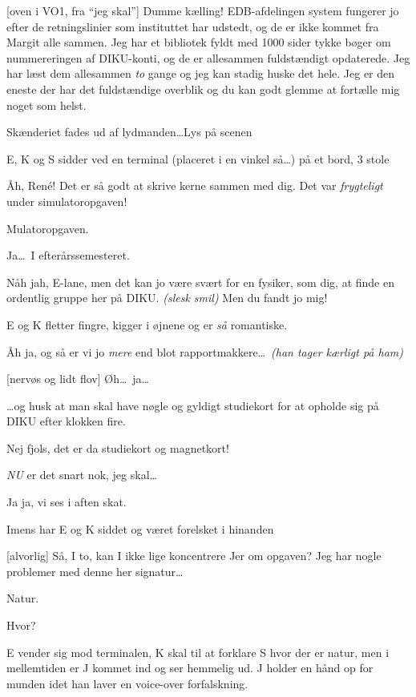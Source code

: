 \documentclass[danish]{article}
\begin{document}
\begin{sketch}
[oven i VO1, fra ``jeg skal''] Dumme kælling! EDB-afdelingen system
fungerer jo efter de retningslinier som instituttet har udstedt, og de er ikke
kommet fra Margit alle sammen. Jeg har et bibliotek fyldt med 1000 sider tykke
bøger om nummereringen af DIKU-konti, og de er allesammen fuldstændigt
opdaterede. Jeg har læst dem allesammen \emph{to} gange og jeg kan stadig huske
det hele. Jeg er den eneste der har det fuldstændige overblik og du kan godt
glemme at fortælle mig noget som helst.

\scene Skænderiet fades ud af lydmanden\ldots Lys på scenen

\scene E, K og S sidder ved en terminal (placeret i en vinkel så\ldots) på et
bord, 3 stole

 Åh, Ren\'e! Det er så godt at skrive kerne sammen med dig. Det var
\emph{frygteligt} under simulatoropgaven!

 Mulatoropgaven.

 Ja\ldots\ I efterårssemesteret.

 Nåh jah, E-lane, men det kan jo være svært for en fysiker, som dig, at
finde en ordentlig gruppe her på DIKU. \emph{(slesk smil)} Men du fandt jo mig!

\scene E og K fletter fingre, kigger i øjnene og er \emph{så} romantiske.

 Åh ja, og så er vi jo \emph{mere} end blot rapportmakkere\ldots\
\emph{(han tager kærligt på ham)}

[nervøs og lidt flov] Øh\ldots\ ja\ldots

 \ldots{}og husk at man skal have nøgle og gyldigt studiekort for at
opholde sig på DIKU efter klokken fire.

 Nej fjols, det er da studiekort og magnetkort!

 \emph{NU} er det snart nok, jeg skal\ldots

 Ja ja, vi ses i aften skat.

\scene Imens har E og K siddet og været forelsket i hinanden

[alvorlig] Så, I to, kan I ikke lige koncentrere Jer om opgaven? Jeg har
nogle problemer med denne her signatur\ldots

 Natur.

 Hvor?

\scene E vender sig mod terminalen, K skal til at forklare S hvor der er natur,
men i mellemtiden er J kommet ind og ser hemmelig ud. J holder en hånd op for
munden idet han laver en voice-over forfalskning.


\end{sketch}
\end{document}
